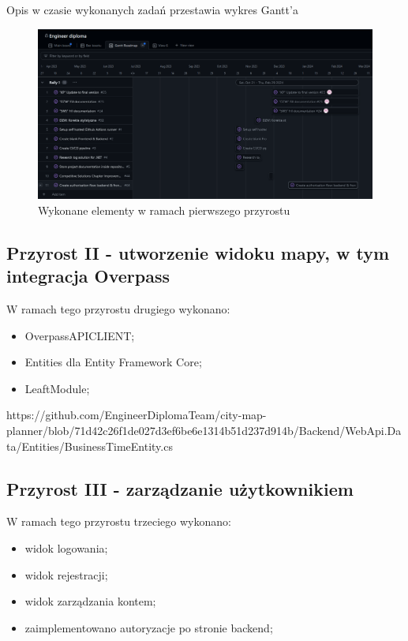 Opis w czasie wykonanych zadań przestawia wykres Gantt'a
\begin{figure}[H]
    \centering
    \includegraphics[width=1\textwidth]{attachments/RALLY1}
    \caption{Wykonane elementy w ramach pierwszego przyrostu}
    \label{fig:figure}
    \end{figure}

    \subsection{Przyrost II - utworzenie widoku mapy, w tym integracja  Overpass}
    \label{sec:przyrost2}

    W ramach tego przyrostu drugiego wykonano:
    \begin{itemize}
        \item OverpassAPICLIENT;
        \item Entities dla Entity Framework Core;
        \item LeaftModule;

    \end{itemize}

    https://github.com/EngineerDiplomaTeam/city-map-planner/blob/71d42c26f1de027d3ef6be6e1314b51d237d914b/Backend/WebApi.Data/Entities/BusinessTimeEntity.cs

    \subsection{Przyrost III - zarządzanie użytkownikiem}
    \label{sec:przyrost3}

    W ramach tego przyrostu trzeciego wykonano:
    \begin{itemize}
        \item widok logowania;
        \item widok rejestracji;
        \item widok zarządzania kontem;
        \item zaimplementowano autoryzacje po stronie backend;
    \end{itemize}

